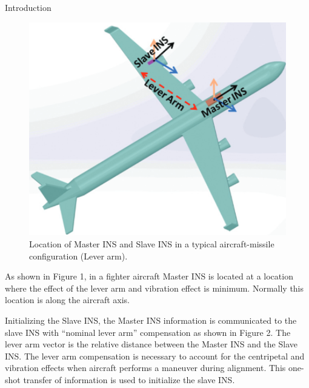 \documentclass[final]{beamer}
\newlength{\colwidth}
\begin{document}
\begin{frame}[t]
\begin{columns}[t]
\begin{column}{\colwidth}
\begin{block}{Introduction}
\lipsum
\begin{figure}
    \centering
    \includegraphics[width=1.0\textwidth]{logos/sambhav1.png}
    \caption{  Location of  Master  INS  and  Slave  INS  in a  typical aircraft-missile configuration (Lever arm).}
    \label{fig:img1}
\end{figure}
\lipsum

\par As shown in Figure 1, in a fighter aircraft Master INS is located at a location where the effect of the lever arm and vibration effect is minimum. Normally this location is along the aircraft axis.

\par Initializing the Slave INS, the Master INS information is communicated to the slave INS with ``nominal lever arm'' compensation as shown in Figure 2. The lever arm vector is the relative distance between the Master INS and the Slave INS. The lever arm compensation is necessary to account for the centripetal and vibration effects when aircraft performs a maneuver during alignment. This one-shot \cite{titterton2004strapdown} transfer of information is used to initialize the slave INS.


\end{block}
\end{column}
\end{columns}
\end{frame}
\end{document}
